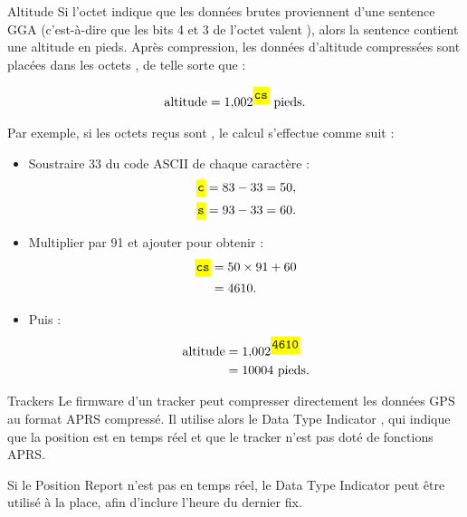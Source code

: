 \begin{aprssideblock}{Altitude}
Si l'octet  indique que les données brutes proviennent d'une
sentence GGA (c'est-à-dire que les bits 4 et 3 de l'octet 
valent ), alors la sentence contient une altitude en pieds.
Après compression, les données d'altitude compressées sont placées dans les
octets , de telle sorte que :

\begin{align*}
\mathrm{altitude}=1{,}002^{\lit{cs}}\ \text{pieds}.
\end{align*}

Par exemple, si les octets  reçus sont \lit{S]}, le calcul
s'effectue comme suit :

\begin{itemize}
\setlength{\itemsep}{0.35em}
\item Soustraire 33 du code ASCII de chaque caractère :
  \begin{align*}
  \lit{c} &= 83-33=50, \\
  \lit{s} &= 93-33=60.
  \end{align*}
\item Multiplier  par 91 et ajouter  pour obtenir  :
  \begin{align*}
  \lit{cs} &= 50\times91+60 \\
            &= 4610.
  \end{align*}
\item Puis :
  \begin{align*}
  \mathrm{altitude} &= 1{,}002^{\lit{4610}} \\
                     &= 10004\ \text{pieds}.
  \end{align*}
\end{itemize}
\end{aprssideblock}

\begin{aprssideblock}{Trackers}
Le firmware d'un tracker peut compresser directement les données GPS au
format APRS compressé. Il utilise alors le Data Type Indicator \lit{!}, qui
indique que la position est en temps réel et que le tracker n'est pas doté de
fonctions APRS.

Si le Position Report n'est pas en temps réel, le Data Type Indicator \lit{/}
peut être utilisé à la place, afin d'inclure l'heure du dernier fix.
\end{aprssideblock}

